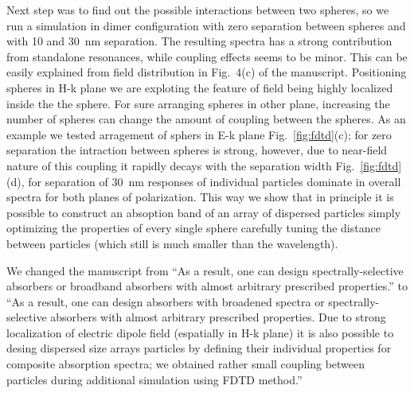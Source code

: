 \documentclass[a4paper]{article}
\begin{document}
Next step was to find out the possible interactions between two
spheres, so we run a simulation in dimer configuration with zero
separation between spheres and with 10 and 30~nm separation.  The
resulting spectra has a strong contribution from standalone
resonances, while coupling effects seems to be minor.  This can be
easily explained from field distribution in Fig.~4(c) of the
manuscript. Positioning spheres in H-k plane we are exploting the
feature of field being highly localized inside the the sphere.  For
sure arranging spheres in other plane, increasing the number of
spheres can change the amount of coupling between the spheres. As an
example we tested arragement of sphers in E-k plane
Fig.~\ref{fig:fdtd}(c); for zero separation the intraction between
spheres is strong, however, due to near-field nature of this coupling
it rapidly decays with the separation width Fig.~\ref{fig:fdtd}(d),
for separation of 30~nm responses of individual particles dominate in
overall spectra for both planes of polarization. This way we show that
in principle it is possible to construct an absoption band of an array
of dispersed particles simply optimizing the properties of every
single sphere carefully tuning the distance between particles (which
still is much smaller than the wavelength).

We changed the manuscript from ``As a result, one can design
spectrally-selective absorbers or broadband absorbers with almost
arbitrary prescribed properties.'' to ``As a result, one can design
absorbers with broadened spectra or spectrally-selective absorbers
with almost arbitrary prescribed properties.  Due to strong
localization of electric dipole field (espatially in H-k plane) it is
also possible to desing dispersed size arrays particles by defining
their individual properties for composite absorption spectra; we
obtained rather small coupling between particles during additional
simulation using FDTD method.''


\end{document}
